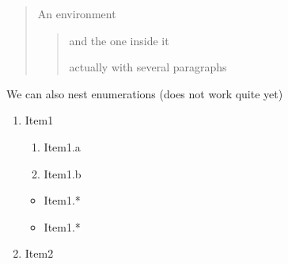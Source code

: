 \documentclass{article}
\begin{document}
\begin{quotation}
An environment

\begin{quotation}
and the one inside it

actually with several paragraphs
\end{quotation}

\end{quotation}

We can also nest enumerations (does not work quite yet)

\begin{enumerate}
\item Item1
\begin{enumerate}
\item Item1.a
\item Item1.b
\end{enumerate}
\begin{itemize}
\item Item1.*
\item Item1.*
\end{itemize}
\item Item2
\end{enumerate}
\end{document}

